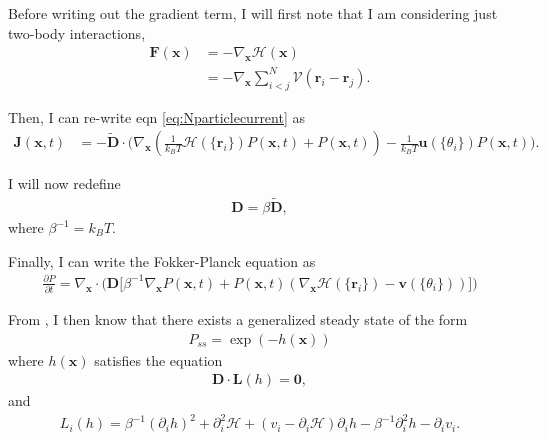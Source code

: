 \documentclass{article}
\begin{document}
Before writing out the gradient term, I will first note that I am considering just two-body
interactions,
\begin{align}
  \bm{F}(\bm{x})&=-\nabla_{\bm{x}}\mathcal{H}(\bm{x})\nonumber\\
                &=-\nabla_{\bm{x}}\sum_{i<j}^N\mathcal{V}(\bm{r}_i-\bm{r}_j).
\end{align}

Then, I can re-write eqn \ref{eq:Nparticlecurrent} as
\begin{align}\label{eq:Nparticlewithpotential}
  \bm{J}(\bm{x},t)&=-\bm{\tilde{D}}
                    \cdot\big(\nabla_{\bm{x}}(\frac{1}{k_BT}\mathcal{H}(\{\bm{r}_i\})
                    P(\bm{x},t)
                    +P(\bm{x},t))
                    -\frac{1}{k_BT}\bm{u}(\{\theta_i\})P(\bm{x},t)\big).
\end{align}

I will now redefine
\begin{align}
  \bm{D}=\beta\bm{\tilde{D}},
\end{align}
where $\beta^{-1}=k_BT$.


Finally, I can write the Fokker-Planck equation as
\begin{align}
  \frac{\partial P}{\partial t}=\nabla_{\bm{x}}\cdot\big(\bm{D}
  \big[\beta^{-1}\nabla_{\bm{x}}P(\bm{x},t)+P(\bm{x},t)(\nabla_{\bm{x}}
  \mathcal{H}(\{\bm{r}_i\})-\bm{v}(\{\theta_i\}))\big]\big)
\end{align}

From \cite{liverpool2018nonequilibrium}, I then know that there exists a generalized steady
state of the form
\begin{align}
  P_{ss}=\exp(-h(\bm{x}))
\end{align}
where $h(\bm{x})$ satisfies the equation
\begin{align}
  \bm{D}\cdot \bm{L}(h)=\bm{0},
\end{align}
and
\begin{align}
  L_i(h) = \beta^{-1}(\partial_ih)^2+\partial_i^2\mathcal{H}
  +(v_i-\partial_i\mathcal{H})\partial_ih-\beta^{-1}\partial_i^2h-\partial_iv_i.
\end{align}





\end{document}
